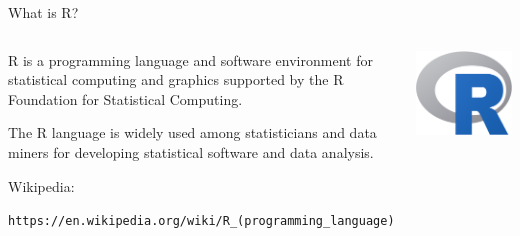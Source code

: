 \documentclass{beamer}
\begin{document}
\begin{frame}{What is R?} %

\begin{columns}

\begin{block}{}
\alert{R is a programming language} and software environment for statistical computing and graphics supported by the R Foundation for Statistical Computing.

The R language is widely used among statisticians and data miners for developing statistical software and data analysis.

Wikipedia: 

\begin{footnotesize}
\texttt{https://en.wikipedia.org/wiki/R\_(programming\_language)}                                                                 \end{footnotesize}
\end{block}

\centering
\includegraphics[height=\textwidth]{figs/Rlogo.png}
\end{columns}


\end{frame}

\end{document}
